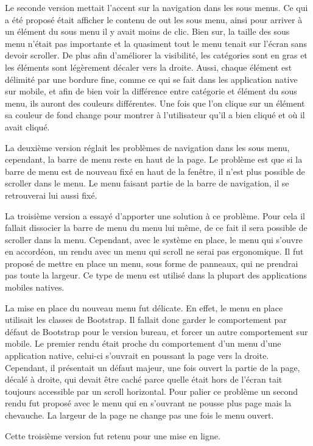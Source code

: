 \documentclass[12pt,a4paper]{article}
\begin{document}
Le seconde version mettait l'accent sur la navigation dans les sous menus. Ce qui a été proposé était afficher le contenu de out les sous menu, ainsi pour arriver à un élément du sous menu il y avait moins de clic. Bien sur, la taille des sous menu n'était pas importante et la quasiment tout le menu tenait sur l'écran sans devoir scroller. De plus afin d'améliorer la visibilité, les catégories sont en gras et les éléments sont légèrement décaler vers la droite. Aussi, chaque élément est délimité par une bordure fine, comme ce qui se fait dans les application native sur mobile, et afin de bien voir la différence entre catégorie et élément du sous menu, ils auront des couleurs différentes. Une fois que l'on clique sur un élément sa couleur de fond change pour montrer à l'utilisateur qu'il a bien cliqué et où il avait cliqué.\par
La deuxième version réglait les problèmes de navigation dans les sous menu, cependant, la barre de menu reste en haut de la page. Le problème est que si la barre de menu est de nouveau fixé en haut de la fenêtre, il n'est plus possible de scroller dans le menu. Le menu faisant partie de la barre de navigation, il se retrouverai lui aussi fixé.\par
La troisième version a essayé d'apporter une solution à ce problème. Pour cela il fallait dissocier la barre de menu du menu lui même, de ce fait il sera possible de scroller dans la menu. Cependant, avec le système en place, le menu qui s'ouvre en accordéon, un rendu avec un menu qui scroll ne serai pas ergonomique. Il fut proposé de mettre en place un menu, sous forme de panneaux, qui ne prendrai pas toute la largeur. Ce type de menu est utilisé dans la plupart des applications mobiles natives.\par
La mise en place du nouveau menu fut délicate. En effet, le menu en place utilisait les classes de Bootstrap. Il fallait donc garder le comportement par défaut de Bootstrap pour le version bureau, et forcer un autre comportement sur mobile. Le premier rendu était proche du comportement d'un menu d'une application native, celui-ci s'ouvrait en poussant la page vers la droite. Cependant, il présentait un défaut majeur, une fois ouvert la partie de la page, décalé à droite, qui devait être caché parce quelle était hors de l'écran tait toujours accessible par un scroll horizontal. Pour palier ce problème un second rendu fut proposé avec le menu qui en s'ouvrant ne pousse plus page mais la chevauche. La largeur de la page ne change pas une fois le menu ouvert.\par 
Cette troisième version fut retenu pour une mise en ligne.
\end{document}
